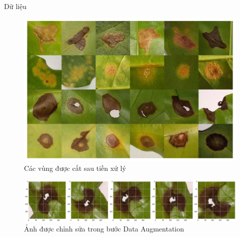 \documentclass{beamer}
\begin{document}
\begin{frame}[allowframebreaks]{Dữ liệu}
	\begin{figure}[H]
		\includegraphics[scale=0.35]{images/image3}
		\caption{Các vùng được cắt sau tiền xử lý}
	\end{figure}

	\framebreak

	\begin{figure}[H]
		\includegraphics[scale=0.2]{images/image2}
		\caption{Ảnh được chỉnh sửa trong bước Data Augmentation}
	\end{figure}

\end{frame}
\end{document}
